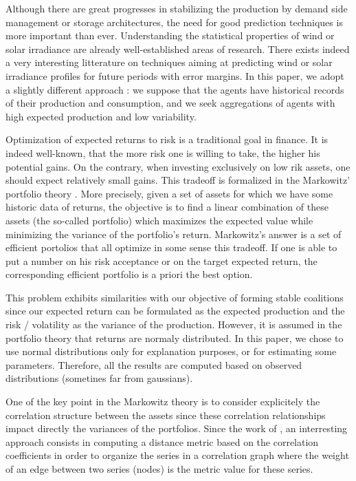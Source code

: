 \documentclass[conference]{IEEEtran}
\begin{document}
Although there are great progresses in stabilizing the production by demand side management or storage architectures, the need for good prediction techniques is more important than ever. Understanding the statistical properties of wind or solar irradiance are already well-established areas of research. There exists indeed a very interesting litterature on techniques aiming at predicting wind or solar irradiance profiles for future periods with error margins. In this paper, we adopt a slightly different approach : we suppose that the agents have historical records of their production and consumption, and we seek aggregations of agents with high expected production and low variability.

Optimization of expected returns to risk is a traditional goal in finance. It is indeed well-known, that the more risk one is willing to take, the higher his potential gains. On the contrary, when investing exclusively on low rik assets, one should expect relatively small gains. This tradeoff is formalized in the Markowitz' portfolio theory \cite{Markowitz1959}. More precisely, given a set of assets for which we have some historic data of returns, the objective is to find a linear combination of these assets (the so-called portfolio) which maximizes the expected value while minimizing the variance of the portfolio's return. Markowitz's answer is a set of efficient portolios that all optimize in some sense this tradeoff. If one is able to put a number on his risk acceptance or on the target expected return, the corresponding efficient portfolio is a priori the best option. 

This problem exhibits similarities with our objective of forming stable coalitions since our expected return can be formulated as the expected production and the risk / volatility as the variance of the production. However, it is assumed in the portfolio theory \cite{Markowitz1959} that returns are normaly distributed. In this paper, we chose to use normal distributions only for explanation purposes, or for estimating some parameters. Therefore, all the results are computed based on observed distributions (sometines far from gaussians).

One of the key point in the Markowitz theory is to consider explicitely the correlation structure between the assets since these correlation relationships impact directly the variances of the portfolios. Since the work of \cite{Mantegna1999}, an interresting approach consists in computing a distance metric based on the correlation coefficients in order to organize the series in a correlation graph where the weight of an edge between two series (nodes) is the metric value for these series.
\end{document}
